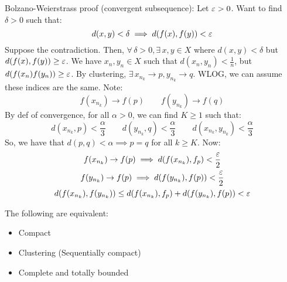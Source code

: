 \documentclass{article}
\begin{document}
\begin{pf}[source=Primary Source Material]
    Bolzano-Weierstrass proof (convergent subsequence): \vsp
    Let $ \operatorname{\varepsilon} > 0 $. Want to find $ \delta > 0 $ such that:
    \begin{equation*}
        d(x, y) < \delta \implies d(f(x), f(y)) < \operatorname{\varepsilon}
    \end{equation*}
    Suppose the contradiction.
    Then, $ \forall \, \delta > 0, \exists \, x, y \in X $ where $ d(x, y) < \delta $ but
    $ d(f(x), f(y)) \geq \operatorname{\varepsilon} $.
    We have $ x_{n}, y_{n} \in X $ such that
    $ d(x_{n}, y_{n}) < \frac{1}{n} $, but $ d(f(x_{n}) f(y_{n})) \geq \operatorname{\varepsilon} $.
    By clustering, $ \exists \, x_{n_{k}} \rightarrow p, y_{n_{k}} \rightarrow q $.
    WLOG, we can assume these indices are the same.
    Note:
    \begin{equation*}
        f(x_{n_{k}}) \rightarrow f(p) \qquad f(y_{n_{k}}) \rightarrow f(q)
    \end{equation*}
    By def of convergence, for all $ \alpha > 0 $, we can find $ K \geq 1 $ such that:
    \begin{equation*}
        d(x_{n_{k}}, p) < \frac{\alpha}{3} \qquad
        d(y_{n_{k}}, q) < \frac{\alpha}{3} \qquad
        d(x_{n_{k}}, y_{n_{k}}) < \frac{\alpha}{3}
    \end{equation*}
    So, we have that $ d(p, q) < \alpha \implies p = q $ for all $ k \geq K $. Now:
    \begin{gather*}
        f(x_{n_{k}}) \rightarrow f(p) \implies d(f(x_{n_{k}}), f_{p}) < \frac{\operatorname{\varepsilon}}{2} \\
        f(y_{n_{k}}) \rightarrow f(p) \implies d(f(y_{n_{k}}), f(p)) < \frac{\operatorname{\varepsilon}}{2} \\
        d(f(x_{n_{k}}), f(y_{n_{k}})) \leq d(f(x_{n_{k}}), f_{p}) + d(f(y_{n_{k}}), f(p)) < \operatorname{\varepsilon}
    \end{gather*}
\end{pf}

\begin{thm}
    The following are equivalent:
    \begin{itemize}
        \item Compact
        \item Clustering (Sequentially compact)
        \item Complete and totally bounded
    \end{itemize}
\end{thm}
\end{document}
